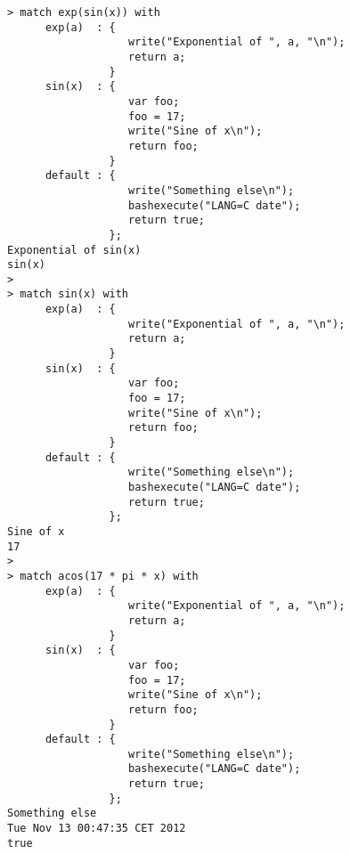 \begin{center}\begin{minipage}{15cm}\begin{Verbatim}[frame=single]
> match exp(sin(x)) with
      exp(a)  : { 
                   write("Exponential of ", a, "\n");
                   return a;
                }
      sin(x)  : {
                   var foo;
                   foo = 17;
                   write("Sine of x\n");
                   return foo;
                }
      default : {
                   write("Something else\n");
                   bashexecute("LANG=C date");
                   return true;
                };
Exponential of sin(x)
sin(x)
> 
> match sin(x) with
      exp(a)  : { 
                   write("Exponential of ", a, "\n");
                   return a;
                }
      sin(x)  : {
                   var foo;
                   foo = 17;
                   write("Sine of x\n");
                   return foo;
                }
      default : {
                   write("Something else\n");
                   bashexecute("LANG=C date");
                   return true;
                };
Sine of x
17
> 
> match acos(17 * pi * x) with
      exp(a)  : { 
                   write("Exponential of ", a, "\n");
                   return a;
                }
      sin(x)  : {
                   var foo;
                   foo = 17;
                   write("Sine of x\n");
                   return foo;
                }
      default : {
                   write("Something else\n");
                   bashexecute("LANG=C date");
                   return true;
                };
Something else
Tue Nov 13 00:47:35 CET 2012
true
\end{Verbatim}
\end{minipage}\end{center}
